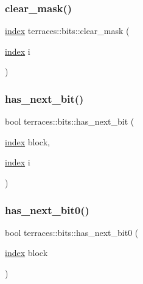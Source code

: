 \mbox{\label{namespaceterraces_1_1bits_a45be18f00889c65a814781516e5c96a7}} 
\subsubsection{\texorpdfstring{clear\+\_\+mask()}{clear\_mask()}}
{\footnotesize\ttfamily \hyperlink{namespaceterraces_adbc33ccb543d1634e96d0eb02e472c77}{index} terraces\+::bits\+::clear\+\_\+mask (\begin{DoxyParamCaption}\item[{\hyperlink{namespaceterraces_adbc33ccb543d1634e96d0eb02e472c77}{index}}]{i }\end{DoxyParamCaption})\hspace{0.3cm}{\ttfamily [inline]}}

\mbox{\label{namespaceterraces_1_1bits_ade5941b5d275bf11611c59d27d3d699d}} 
\subsubsection{\texorpdfstring{has\+\_\+next\+\_\+bit()}{has\_next\_bit()}}
{\footnotesize\ttfamily bool terraces\+::bits\+::has\+\_\+next\+\_\+bit (\begin{DoxyParamCaption}\item[{\hyperlink{namespaceterraces_adbc33ccb543d1634e96d0eb02e472c77}{index}}]{block,  }\item[{\hyperlink{namespaceterraces_adbc33ccb543d1634e96d0eb02e472c77}{index}}]{i }\end{DoxyParamCaption})\hspace{0.3cm}{\ttfamily [inline]}}

\mbox{\label{namespaceterraces_1_1bits_ab0ef5fb720dacd43e4092bffb7022213}} 
\subsubsection{\texorpdfstring{has\+\_\+next\+\_\+bit0()}{has\_next\_bit0()}}
{\footnotesize\ttfamily bool terraces\+::bits\+::has\+\_\+next\+\_\+bit0 (\begin{DoxyParamCaption}\item[{\hyperlink{namespaceterraces_adbc33ccb543d1634e96d0eb02e472c77}{index}}]{block }\end{DoxyParamCaption})\hspace{0.3cm}{\ttfamily [inline]}}


